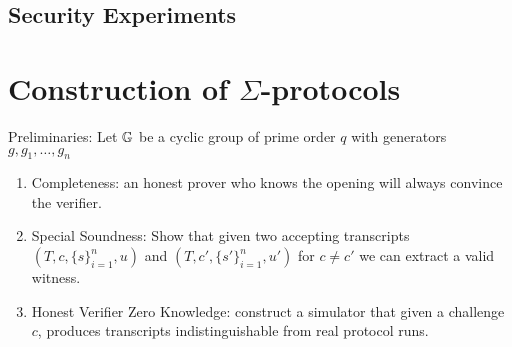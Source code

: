 \subsection{Security Experiments}





\newpage






\section{Construction of $\Sigma$-protocols}\label{sec:sigmaproofs}


Preliminaries: Let $\mathbb{G}$ be a cyclic group of prime order $q$ with generators $g, g_1, \dots, g_n$

\begin{enumerate}
    \item Completeness: an honest prover who knows the opening will always convince the verifier.
    
    \item Special Soundness: Show that given two accepting transcripts $(T, c, \{s\}_{i=1}^n, u)$ and $(T, c', \{s'\}_{i=1}^n, u')$ for $c \neq c'$ we can extract a valid witness.
    
    \item Honest Verifier Zero Knowledge: construct a simulator that given a challenge $c$, produces transcripts indistinguishable from real protocol runs.
\end{enumerate}










\newpage

